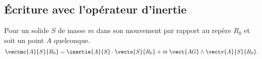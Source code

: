 %
%
%
%
%
%

\subsection{Écriture avec l'opérateur d'inertie}

\begin{prop}
Pour un solide $S$ de masse $m$ dans son mouvement par rapport au repère $R_0$ et soit un point $A$ quelconque.
$$\vectmc{A}{S}{R_0}=\inertie{A}{S}\cdot \vecto{S}{R_0}+m\;\vect{AG}\wedge \vectv{A}{S}{R_0}.
$$
\end{prop}


